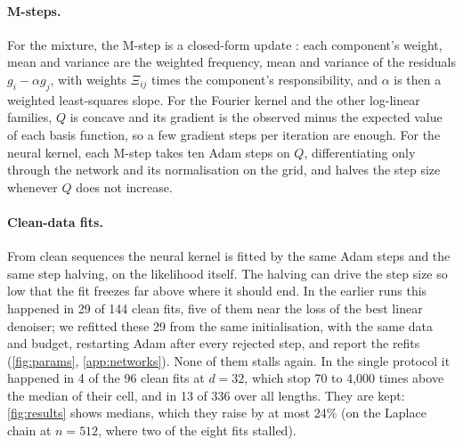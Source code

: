 \documentclass{article}
\begin{document}
\paragraph{M-steps.} For the mixture, the M-step is a closed-form update \cite{meng1993maximum}: each component's weight,
mean and variance are the weighted frequency, mean and variance of the residuals $g_i-\alpha g_j$, with weights $\Xi_{ij}$
times the component's responsibility, and $\alpha$ is then a weighted least-squares slope. For the Fourier kernel and
the other log-linear families, $Q$ is concave and its gradient is the observed minus the expected value of each basis
function, so a few gradient steps per iteration are enough. For the neural kernel, each M-step takes ten Adam steps on
$Q$, differentiating only through the network and its normalisation on the grid, and halves the step size whenever $Q$
does not increase.

\paragraph{Clean-data fits.} From clean sequences the neural kernel is fitted by the same Adam steps and the same step
halving, on the likelihood itself. The halving can drive the step size so low that the fit freezes far above where it
should end. In the earlier runs this happened in 29 of 144 clean fits, five of them near the loss of the best linear
denoiser; we refitted these 29 from the same initialisation, with the same data and budget, restarting Adam after every
rejected step, and report the refits (\cref{fig:params}, \cref{app:networks}). None of them stalls again. In the single
protocol it happened in 4 of the 96 clean fits at $d=32$, which stop 70 to 4{,}000 times above the median of their
cell, and in 13 of 336 over all lengths. They are kept: \cref{fig:results} shows medians, which they raise by at most 24\% (on
the Laplace chain at $n=512$, where two of the eight fits stalled).
\end{document}
